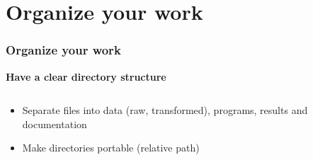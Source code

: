 \documentclass[xcolor=x11names,compress]{beamer}
\renewcommand{\(}{\begin{columns}}
\renewcommand{\)}{\end{columns}}
\newcommand{\<}[1]{\begin{column}{#1}}
\renewcommand{\>}{\end{column}}
\begin{document}
\section{Organize your work }

\begin{frame}
\frametitle{Organize your work }
\textcolor{siap}{\textbf{Have a clear directory structure}}
 \pause
\begin{columns}[t]
 \begin{column}{0.4\textwidth}

    \begin{itemize}[<+->]
   \item Separate files into data (raw, transformed), programs, results and documentation
   \item Make directories portable (relative path)
    \end{itemize}
\end{column}
  \begin{column}{0.6\textwidth}
    \begin{center}
    \begin{itemize}

    \end{itemize}
    \end{center}
  \end{column}
\end{columns}
\end{frame}
\end{document}
